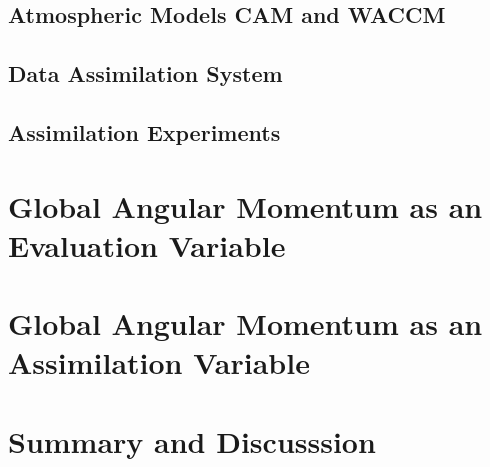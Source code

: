 \documentclass[draft,jgrga]{agutex}
\begin{document}
\begin{article}
\subsection{Atmospheric Models CAM and WACCM}
\label{sec:models}


\subsection{Data Assimilation System}
\label{sec:dart}


\subsection{Assimilation Experiments}
\label{sec:expts}



\section{Global Angular Momentum as an Evaluation Variable}
\label{sec:evaluation_variable}



\section{Global Angular Momentum as an Assimilation Variable}
\label{sec:assimilation_variable}



\section{Summary and Discusssion}

\label{sec:discussion}




\end{article}
\end{document}
